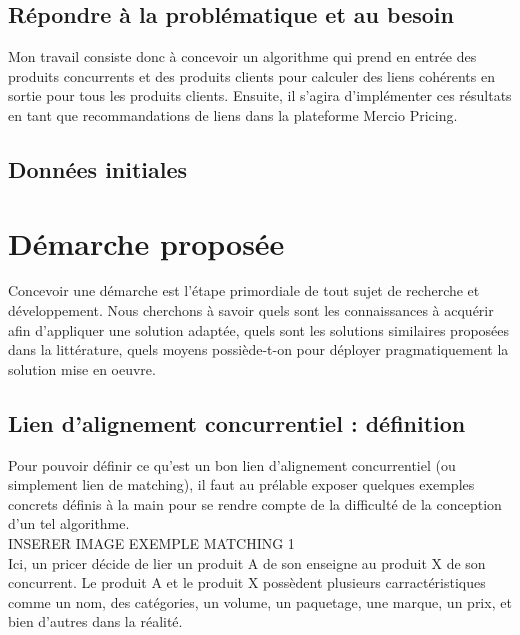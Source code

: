 \documentclass{rapportCS}
\begin{document}
\subsection{Répondre à la problématique et au besoin}
Mon travail consiste donc à concevoir un algorithme qui prend en entrée des produits concurrents et 
des produits clients pour calculer des liens cohérents en sortie pour tous les produits clients.
Ensuite, il s'agira d'implémenter ces résultats en tant que recommandations de liens dans la
plateforme Mercio Pricing.\\

\subsection{Données initiales}

\newpage

\section{Démarche proposée}
Concevoir une démarche est l'étape primordiale de tout sujet de recherche et développement.
Nous cherchons à savoir quels sont les connaissances à acquérir afin d'appliquer une solution adaptée,
quels sont les solutions similaires proposées dans la littérature, quels moyens possiède-t-on pour
déployer pragmatiquement la solution mise en oeuvre.\\

\subsection{Lien d'alignement concurrentiel : définition}
Pour pouvoir définir ce qu'est un bon lien d'alignement concurrentiel (ou simplement lien de matching),
il faut au prélable exposer quelques exemples concrets définis à la main pour se rendre compte de la 
difficulté de la conception d'un tel algorithme. \\

INSERER IMAGE EXEMPLE MATCHING 1\\

Ici, un pricer décide de lier un produit A de son enseigne au produit X de son concurrent. 
Le produit A et le produit X possèdent plusieurs carractéristiques comme un nom, des catégories, un volume, un paquetage,
une marque, un prix, et bien d'autres dans la réalité.
\end{document}
